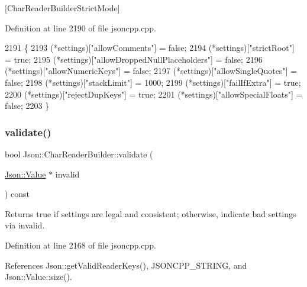 \mbox{[}Char\+Reader\+Builder\+Strict\+Mode\mbox{]} 

Definition at line 2190 of file jsoncpp.\+cpp.


\begin{DoxyCode}
2191 \{
2193   (*settings)[\textcolor{stringliteral}{"allowComments"}] = \textcolor{keyword}{false};
2194   (*settings)[\textcolor{stringliteral}{"strictRoot"}] = \textcolor{keyword}{true};
2195   (*settings)[\textcolor{stringliteral}{"allowDroppedNullPlaceholders"}] = \textcolor{keyword}{false};
2196   (*settings)[\textcolor{stringliteral}{"allowNumericKeys"}] = \textcolor{keyword}{false};
2197   (*settings)[\textcolor{stringliteral}{"allowSingleQuotes"}] = \textcolor{keyword}{false};
2198   (*settings)[\textcolor{stringliteral}{"stackLimit"}] = 1000;
2199   (*settings)[\textcolor{stringliteral}{"failIfExtra"}] = \textcolor{keyword}{true};
2200   (*settings)[\textcolor{stringliteral}{"rejectDupKeys"}] = \textcolor{keyword}{true};
2201   (*settings)[\textcolor{stringliteral}{"allowSpecialFloats"}] = \textcolor{keyword}{false};
2203 \}
\end{DoxyCode}
\mbox{\label{class_json_1_1_char_reader_builder_af890b5cb70e9b372e41de5c9e6535d21}} 
\subsubsection{\texorpdfstring{validate()}{validate()}}
{\footnotesize\ttfamily bool Json\+::\+Char\+Reader\+Builder\+::validate (\begin{DoxyParamCaption}\item[{\hyperlink{class_json_1_1_value}{Json\+::\+Value} $\ast$}]{invalid }\end{DoxyParamCaption}) const}

\begin{DoxyReturn}{Returns}
true if \textquotesingle{}settings\textquotesingle{} are legal and consistent; otherwise, indicate bad settings via \textquotesingle{}invalid\textquotesingle{}. 
\end{DoxyReturn}


Definition at line 2168 of file jsoncpp.\+cpp.



References Json\+::get\+Valid\+Reader\+Keys(), J\+S\+O\+N\+C\+P\+P\+\_\+\+S\+T\+R\+I\+NG, and Json\+::\+Value\+::size().


